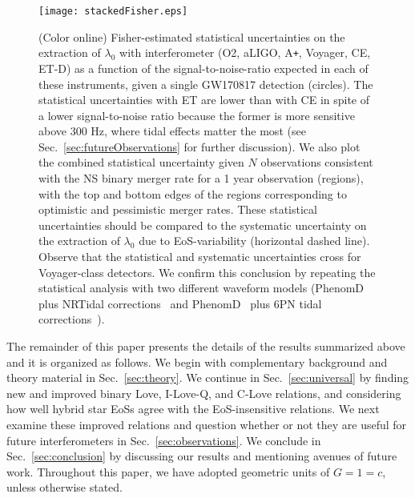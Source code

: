\documentclass[prd,twocolumn,nofootinbib,superscriptaddress,amsmath,amssymb]{revtex4-1}
\begin{document}
\begin{figure}
\begin{center} 
\texttt{[image: stackedFisher.eps]}
\end{center}
\caption{(Color online) Fisher-estimated statistical uncertainties on the extraction of $\lambda_{0}$ with interferometer (O2, aLIGO, A\texttt{+}, Voyager, CE, ET-D) as a function of the signal-to-noise-ratio expected in each of these instruments, given a single GW170817 detection (circles). The statistical uncertainties with ET are lower than with CE in spite of a lower signal-to-noise ratio because the former is more sensitive above 300 Hz, where tidal effects matter the most (see Sec.~\ref{sec:futureObservations} for further discussion). We also plot the combined statistical uncertainty given $N$ observations consistent with the NS binary merger rate for a 1 year observation (regions), with the top and bottom edges of the regions corresponding to optimistic and pessimistic merger rates. These statistical uncertainties should be compared to the systematic uncertainty on the extraction of $\lambda_{0}$ due to EoS-variability (horizontal dashed line). Observe that the statistical and systematic uncertainties cross for Voyager-class detectors. We confirm this conclusion by repeating the statistical analysis with two different waveform models (PhenomD~\cite{PhenomDI,PhenomDII} plus NRTidal corrections~\cite{Samajdar:NRTidal} and PhenomD~\cite{PhenomDI,PhenomDII} plus 6PN tidal corrections~\cite{Wade:tidalCorrections}).}
\label{fig:stackedFisher}
\end{figure} 

The remainder of this paper presents the details of the results summarized above and it is organized as follows. 
We begin with complementary background and theory material in Sec.~\ref{sec:theory}.
We continue in Sec.~\ref{sec:universal} by finding new and improved binary Love, I-Love-Q, and C-Love relations, and considering how well hybrid star EoSs agree with the EoS-insensitive relations.
We next examine these improved relations and question whether or not they are useful for future interferometers in Sec.~\ref{sec:observations}.
We conclude in Sec.~\ref{sec:conclusion} by discussing our results and mentioning avenues of future work.
Throughout this paper, we have adopted geometric units of $G=1=c$, unless otherwise stated.

\end{document}
